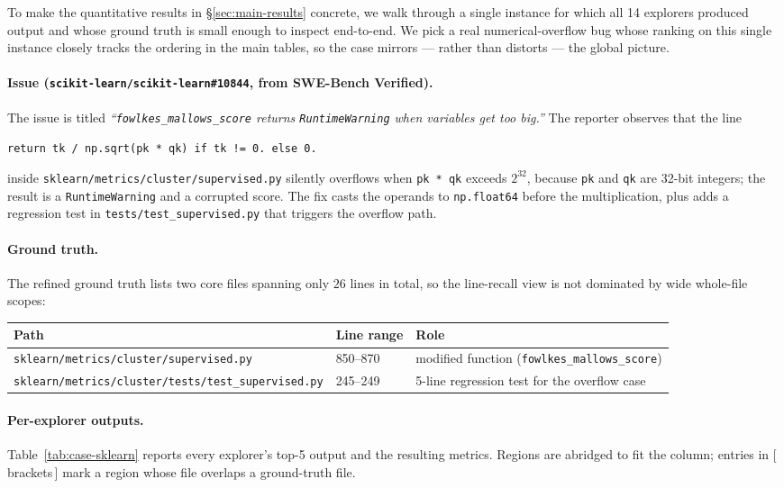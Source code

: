 To make the quantitative results in \S\ref{sec:main-results} concrete, we walk through a single instance for which all 14 explorers produced output and whose ground truth is small enough to inspect end-to-end. We pick a real numerical-overflow bug whose ranking on this single instance closely tracks the ordering in the main tables, so the case mirrors --- rather than distorts --- the global picture.

\paragraph{Issue (\texttt{scikit-learn/scikit-learn\#10844}, from SWE-Bench Verified).}
The issue is titled \emph{``\texttt{fowlkes\_mallows\_score} returns \texttt{RuntimeWarning} when variables get too big.''} The reporter observes that the line
\begin{center}\small\texttt{return tk / np.sqrt(pk * qk) if tk != 0. else 0.}\end{center}
inside \texttt{sklearn/metrics/cluster/supervised.py} silently overflows when \texttt{pk * qk} exceeds $2^{32}$, because \texttt{pk} and \texttt{qk} are 32-bit integers; the result is a \texttt{RuntimeWarning} and a corrupted score. The fix casts the operands to \texttt{np.float64} before the multiplication, plus adds a regression test in \texttt{tests/test\_supervised.py} that triggers the overflow path.

\paragraph{Ground truth.}
The refined ground truth lists two core files spanning only $26$ lines in total, so the line-recall view is not dominated by wide whole-file scopes:
\begin{center}\small
\begin{tabular}{lll}
\toprule
Path & Line range & Role \\
\midrule
\texttt{sklearn/metrics/cluster/supervised.py}              & 850--870  & modified function (\texttt{fowlkes\_mallows\_score}) \\
\texttt{sklearn/metrics/cluster/tests/test\_supervised.py}  & 245--249  & 5-line regression test for the overflow case \\
\bottomrule
\end{tabular}
\end{center}

\paragraph{Per-explorer outputs.}
Table~\ref{tab:case-sklearn} reports every explorer's top-5 output and the resulting metrics. Regions are abridged to fit the column; entries in [\,brackets\,] mark a region whose file overlaps a ground-truth file.

